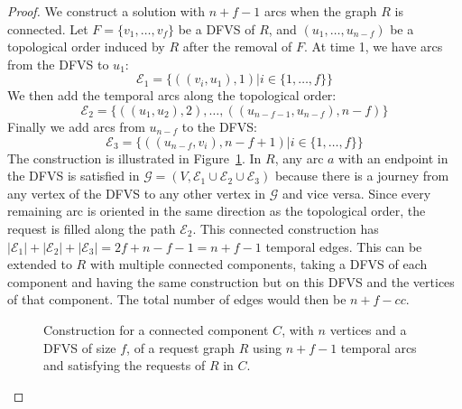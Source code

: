 \documentclass[11pt]{article}%
\begin{document}
  \begin{proof}
    We construct a solution with $n+f-1$ arcs when the graph $R$ is connected. Let $F=\{v_1,\dots,v_f\}$ be a DFVS of $R$, and $(u_1,\dots,u_{n-f})$ be a topological order induced by $R$ after the removal of $F$. At time 1, we have arcs from the DFVS to $u_1$: $$\mathcal E_1 = \{((v_i,u_1),1)| i \in \{1,\dots,f\}\}$$
    We then add the temporal arcs along the topological order:
    $$\mathcal E_2=\{((u_1,u_2),2),\dots,((u_{n-f-1},u_{n-f}),n-f)\}$$
    Finally we add arcs from $u_{n-f}$ to the DFVS: 
    $$\mathcal E_3 = \{((u_{n-f},v_i),n-f+1)| i \in \{1,\dots,f\}\}$$
    The construction is illustrated in Figure~\ref{fig:soldirected}. In $R$, any arc $a$ with an endpoint in the DFVS is satisfied in $\mathcal G = (V, \mathcal E_1 \cup \mathcal E_2 \cup \mathcal E_3)$ because there is a journey from any vertex of the DFVS to any other vertex in $\mathcal G$ and vice versa. Since every remaining arc is oriented in the same direction as the topological order, the request is filled along the path $\mathcal E_2$. This connected construction has $|\mathcal E_1|+|\mathcal E_2|+|\mathcal E_3|=2f+n-f-1=n+f-1$ temporal edges.  This can be extended to $R$ with multiple connected components, taking a DFVS of each component and having the same construction but on this DFVS and the vertices of that component. The total number of edges would then be $n+f-cc$.
    \begin{figure}[!ht]
      \centering
      \caption{Construction for a connected component $C$, with $n$ vertices and a DFVS of size $f$, of a request graph $R$ using $n+f-1$ temporal arcs and satisfying the requests of $R$ in $C$.}
      \label{fig:soldirected}
    \end{figure}
  \end{proof}
\end{document}
